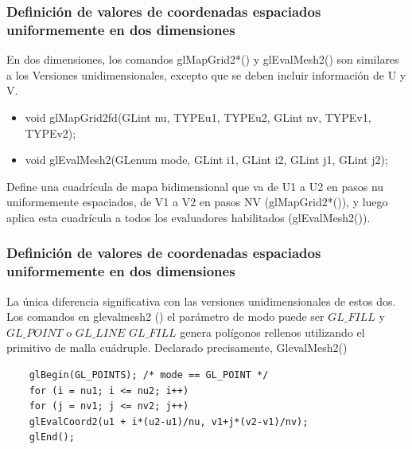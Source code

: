 \documentclass[10.5pt]{beamer}
\begin{document}
\begin{frame}[fragile]
\frametitle{Definición de valores de coordenadas espaciados uniformemente en dos dimensiones}

En dos dimensiones, los comandos glMapGrid2*() y glEvalMesh2() son similares a los
Versiones unidimensionales, excepto que se deben incluir información de U y V.

\begin{itemize}
    \item void glMapGrid2{fd}(GLint nu, TYPEu1, TYPEu2,
    GLint nv, TYPEv1, TYPEv2);
    \item void glEvalMesh2(GLenum mode, GLint i1, GLint i2, GLint j1, GLint j2);
\end{itemize}

Define una cuadrícula de mapa bidimensional que va de U1 a U2 en pasos nu uniformemente espaciados, de V1 a
V2 en pasos NV (glMapGrid2*()), y luego aplica esta cuadrícula a todos los evaluadores habilitados
(glEvalMesh2()).

\end{frame}

\begin{frame}[fragile]
    \frametitle{Definición de valores de coordenadas espaciados uniformemente en dos dimensiones}

La única diferencia significativa con las versiones unidimensionales de estos dos. Los comandos en glevalmesh2 () el parámetro de modo puede ser $GL\_FILL$ y $GL\_POINT$
o $GL\_LINE$ $GL\_FILL$ genera polígonos rellenos utilizando el primitivo de malla cuádruple. Declarado precisamente,
GlevalMesh2()

\begin{alertblock}{}
    \small
    \begin{verbatim}
    glBegin(GL_POINTS); /* mode == GL_POINT */
    for (i = nu1; i <= nu2; i++)
    for (j = nv1; j <= nv2; j++)
    glEvalCoord2(u1 + i*(u2-u1)/nu, v1+j*(v2-v1)/nv);
    glEnd();
    \end{verbatim}
\end{alertblock}
\end{frame}
\end{document}
